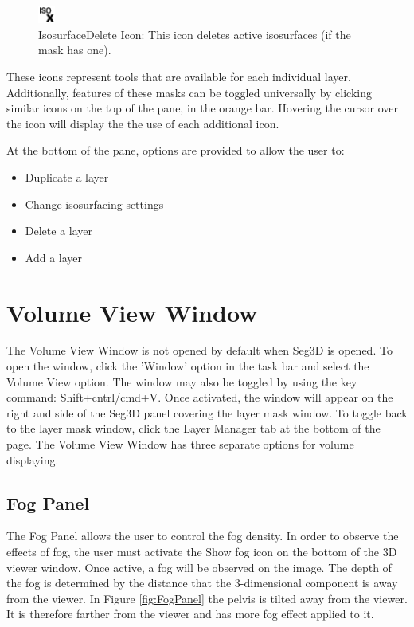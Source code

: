 \documentclass[fleqn,11pt,openany]{book}
\begin{document}
\begin{figure}[h!]
  \includegraphics[width=0.05\textwidth]{Seg3DTutorial_figures/IsosurfaceDeleteOff.png}%
  \caption{IsosurfaceDelete Icon: This icon deletes active isosurfaces (if the mask has one).}
\end{figure}

These icons represent tools that are available for each individual layer.  
Additionally, features of these masks can be toggled universally by clicking similar icons on the top of the pane, in the orange bar.  
Hovering the cursor over the icon will display the the use of each additional icon.

At the bottom of the pane, options are provided to allow the user to: 
\begin{itemize}
\item Duplicate a layer
\item Change isosurfacing settings
\item Delete a layer
\item Add a layer
\end{itemize}


\section{Volume View Window}
The Volume View Window is not opened by default when Seg3D is opened.  
To open the window, click the 'Window' option in the task bar and select the Volume View option.  
The window may also be toggled by using the key command: Shift+cntrl/cmd+V. 
Once activated, the window will appear on the right and side of the Seg3D panel covering the layer mask window.
To toggle back to the layer mask window, click the Layer Manager tab at the bottom of the page.
The Volume View Window has three separate options for volume displaying.



\subsection{Fog Panel}



The Fog Panel allows the user to control the fog density.  
In order to observe the effects of fog, the user must activate the Show fog icon on the bottom of the 3D viewer window.
Once active, a fog will be observed on the image.  
The depth of the fog is determined by the distance that the 3-dimensional component is away from the viewer.   
In Figure \ref{fig:FogPanel} the pelvis is tilted away from the viewer.
It is therefore farther from the viewer and has more fog effect applied to it.
\end{document}
